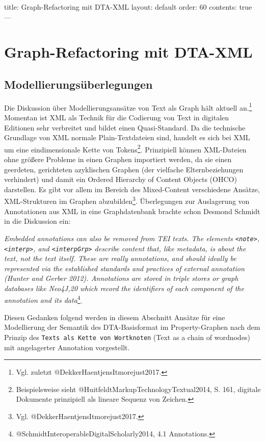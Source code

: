 \documentclass[12pt,ngerman,]{article}
\begin{document}
title: Graph-Refactoring mit DTA-XML layout: default order: 60 contents:
true ---

\section{Graph-Refactoring mit
DTA-XML}\label{graph-refactoring-mit-dta-xml}

\subsection{Modellierungsüberlegungen}\label{modellierungsuxfcberlegungen}

Die Diskussion über Modellierungsansätze von Text als Graph hält aktuell
an.\footnote{Vgl. zuletzt @DekkerHaentjensItmorejust2017.} Momentan ist
XML als Technik für die Codierung von Text in digitalen Editionen sehr
verbreitet und bildet einen Quasi-Standard. Da die technische Grundlage
von XML normale Plain-Textdateien sind, handelt es sich bei XML um eine
eindimensionale Kette von Tokens\footnote{Beispielsweise sieht
  @HuitfeldtMarkupTechnologyTextual2014, S. 161, digitale Dokumente
  prinzipiell als lineare Sequenz von Zeichen.}. Prinzipiell können
XML-Dateien ohne größere Probleme in einen Graphen importiert werden, da
sie einen geerdeten, gerichteten azyklischen Graphen (der vielfache
Elternbeziehungen verhindert) und damit ein Ordered Hierarchy of Content
Objects (OHCO) darstellen. Es gibt vor allem im Bereich des
Mixed-Content verschiedene Ansätze, XML-Strukturen im Graphen
abzubilden\footnote{Vgl. @DekkerHaentjensItmorejust2017.}. Überlegungen
zur Auslagerung von Annotationen aus XML in eine Graphdatenbank brachte
schon Desmond Schmidt in die Diskussion ein:

\emph{Embedded annotations can also be removed from TEI texts. The
elements \texttt{\textless{}note\textgreater{}},
\texttt{\textless{}interp\textgreater{}}, and
\texttt{\textless{}interpGrp\textgreater{}} describe content that, like
metadata, is about the text, not the text itself. These are really
annotations, and should ideally be represented via the established
standards and practices of external annotation (Hunter and Gerber 2012).
Annotations are stored in triple stores or graph databases like Neo4J,20
which record the identifiers of each component of the annotation and its
data}\footnote{@SchmidtInteroperableDigitalScholarly2014, 4.1
  Annotations.}.

Diesen Gedanken folgend werden in diesem Abschnitt Ansätze für eine
Modellierung der Semantik des DTA-Basisformat im Property-Graphen nach
dem Prinzip des \texttt{Texts\ als\ Kette\ von\ Wortknoten} (Text as a
chain of wordnodes) mit angelagerter Annotation vorgestellt.
\end{document}
